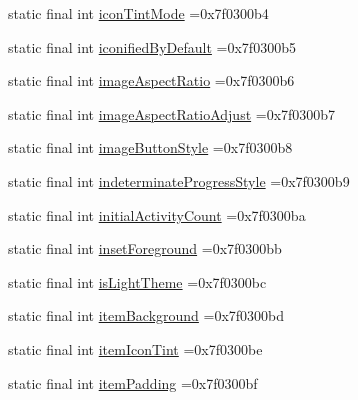 \begin{DoxyCompactItemize}
\item 
static final int \mbox{\hyperlink{classbr_1_1unb_1_1cic_1_1mp_1_1marketmaster_1_1test_1_1R_1_1attr_a6ff531094ece33520acf4e20b54bfad1}{icon\+Tint\+Mode}} =0x7f0300b4
\item 
static final int \mbox{\hyperlink{classbr_1_1unb_1_1cic_1_1mp_1_1marketmaster_1_1test_1_1R_1_1attr_a1a2f41755f0bcc6f1e25e9af8f6bb27a}{iconified\+By\+Default}} =0x7f0300b5
\item 
static final int \mbox{\hyperlink{classbr_1_1unb_1_1cic_1_1mp_1_1marketmaster_1_1test_1_1R_1_1attr_a043cb8527e44e539052b127bf9c3d49f}{image\+Aspect\+Ratio}} =0x7f0300b6
\item 
static final int \mbox{\hyperlink{classbr_1_1unb_1_1cic_1_1mp_1_1marketmaster_1_1test_1_1R_1_1attr_a93272f715f73468f6b1f793753a8adc8}{image\+Aspect\+Ratio\+Adjust}} =0x7f0300b7
\item 
static final int \mbox{\hyperlink{classbr_1_1unb_1_1cic_1_1mp_1_1marketmaster_1_1test_1_1R_1_1attr_ac2eb87eb2fa733d7993e3001c9541ff9}{image\+Button\+Style}} =0x7f0300b8
\item 
static final int \mbox{\hyperlink{classbr_1_1unb_1_1cic_1_1mp_1_1marketmaster_1_1test_1_1R_1_1attr_a653a4e877559a304ee57d003d64904d1}{indeterminate\+Progress\+Style}} =0x7f0300b9
\item 
static final int \mbox{\hyperlink{classbr_1_1unb_1_1cic_1_1mp_1_1marketmaster_1_1test_1_1R_1_1attr_af509c748f4087b7a1420a3d7afa4e574}{initial\+Activity\+Count}} =0x7f0300ba
\item 
static final int \mbox{\hyperlink{classbr_1_1unb_1_1cic_1_1mp_1_1marketmaster_1_1test_1_1R_1_1attr_a3500073d9f690ddca2ad46e126ecf825}{inset\+Foreground}} =0x7f0300bb
\item 
static final int \mbox{\hyperlink{classbr_1_1unb_1_1cic_1_1mp_1_1marketmaster_1_1test_1_1R_1_1attr_a1c99ea647a8a2dfe4c4a8707286552df}{is\+Light\+Theme}} =0x7f0300bc
\item 
static final int \mbox{\hyperlink{classbr_1_1unb_1_1cic_1_1mp_1_1marketmaster_1_1test_1_1R_1_1attr_ae54fb2d84f6cf157cefddfda3b23531e}{item\+Background}} =0x7f0300bd
\item 
static final int \mbox{\hyperlink{classbr_1_1unb_1_1cic_1_1mp_1_1marketmaster_1_1test_1_1R_1_1attr_ad4d48d748eac3486b26789140fdac36d}{item\+Icon\+Tint}} =0x7f0300be
\item 
static final int \mbox{\hyperlink{classbr_1_1unb_1_1cic_1_1mp_1_1marketmaster_1_1test_1_1R_1_1attr_a7f2198739bc83e950edd4c5525e34d22}{item\+Padding}} =0x7f0300bf
\item 

\end{DoxyCompactItemize}
